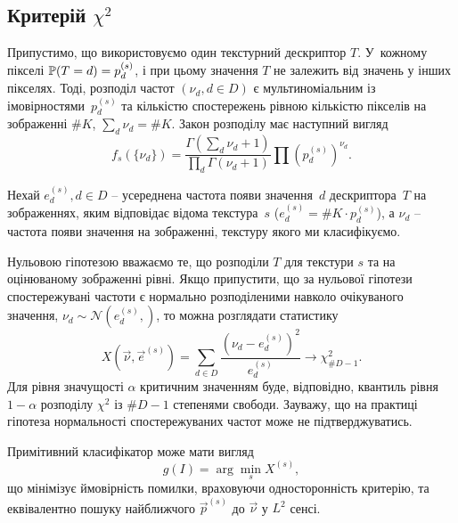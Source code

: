 \subsection{Критерій $\chi^2$}\label{section1.3a}\hfill

Припустимо, що використовуємо один текстурний дескриптор $T$.
У~кожному пікселі $\P(T = d) = p^{(s)}_d$, і при цьому значення $T$ не залежить від значень у інших пікселях.
Тоді, розподіл частот $\left(\nu_d, d\in D\right)$ є мультиноміальним із імовірностями~$p^{(s)}_d$ та 
кількістю спостережень рівною кількістю пікселів на зображенні $\# K$, $\sum_{d}\nu_d = \# K$. 
Закон розподілу має наступний вигляд
\begin{equation*}
    f_s(\{ \nu_d \}) = \frac {\Gamma (\sum_{d}\nu_{d}+1)}{\prod_{d}\Gamma (\nu_{d}+1)} \prod (p^{(s)}_d)^{\nu_d}.
\end{equation*}

Нехай $e^{(s)}_d, d \in D$ -- усереднена частота появи значення~$d$ дескриптора~$T$ на зображеннях, яким відповідає відома текстура~$s$
($e^{(s)}_d = \# K \cdot p^{(s)}_d$), а $\nu_d$ -- частота появи значення на зображенні, текстуру якого ми класифікуємо.

Нульовою гіпотезою вважаємо те, що розподіли $T$ для текстури $s$ та на оцінюваному зображенні рівні.
Якщо припустити, що за нульової гіпотези спостережувані частоти є нормально розподіленими навколо очікуваного значення, $\nu_d \sim \mathcal N(e^{(s)}_d, )$, то можна розглядати статистику
\begin{equation*}\label{e:chi2crit}
    X(\vec \nu,\vec e^{(s)}) = \sum_{d \in D} \frac{\left(\nu_d - e^{(s)}_d\right)^2}{e^{(s)}_d} \longrightarrow \chi^2_{\# D - 1}.
\end{equation*}
Для рівня значущості $\alpha$ критичним значенням буде, відповідно, квантиль рівня $1-\alpha$ розподілу $\chi^2$ із $\# D - 1$ степенями свободи.
Зауважу, що на практиці гіпотеза нормальності спостережуваних частот може не підтверджуватись.

Примітивний класифікатор може мати вигляд
\begin{equation*}\label{e:chi2classifier}
    g(I) = \arg \min_{s} X^{(s)},
\end{equation*} 
що мінімізує ймовірність помилки, враховуючи односторонність критерію, та еквівалентно пошуку найближчого $\vec p^{(s)}$ до $\vec \nu$ у $L^2$ сенсі.

